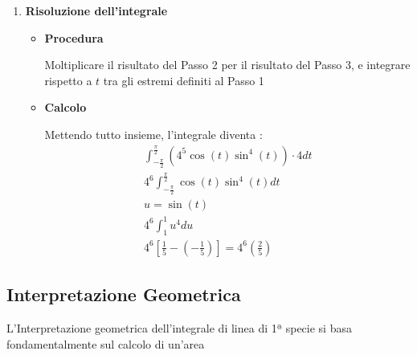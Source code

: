 \begin{enumerate}
\begin{itemize}
            Infine, moltiplicare per $dt$
            \item \textbf{Calcolo}

            Le derivate sono $\frac{dx}{dt}=-4\sin(t)$ e $\frac{dy}{dt}=4\cos(t)$

            L'elemento differenziale diventa : 
            \begin{gather}
                d\ell = \sqrt{(-4\sin(t))^2+(4\cos(t))^2} dtdl \\  
                d\ell=\sqrt{16\sin^2(t)+16\cos^2(t)}dt \\
                d\ell=\sqrt{16(sin^2(t)+cos^2(t))}dt \\
                d\ell=\sqrt{16} = 4dt
            \end{gather}
        \end{itemize}
        \item \textbf{Risoluzione dell'integrale}
            \begin{itemize}
                \item \textbf{Procedura}

                Moltiplicare il risultato del Passo 2 per il risultato del Passo 3, e integrare rispetto a $t$ tra gli estremi definiti al Passo 1
                \item \textbf{Calcolo}

                Mettendo tutto insieme, l'integrale diventa :
                \begin{gather}
                    \int^{\frac{\pi}{2}}_{-\frac{\pi}{2}}(4^5\cos(t)\sin^4(t)) \cdot 4dt\\
                    4^6 \int^{\frac{\pi}{2}}_{-\frac{\pi}{2}} \cos(t)\sin^4(t) dt \\
                    u = \sin(t) \\
                    4^6 \int^1_1 u^4 du \\
                    4^6[\frac{1}{5}-(-\frac{1}{5})] = 4^6(\frac{2}{5})
                \end{gather}
            \end{itemize}
\end{enumerate}
\subsection{Interpretazione Geometrica}
L'Interpretazione geometrica dell'integrale di linea di 1ª specie si basa fondamentalmente sul calcolo di un'area


